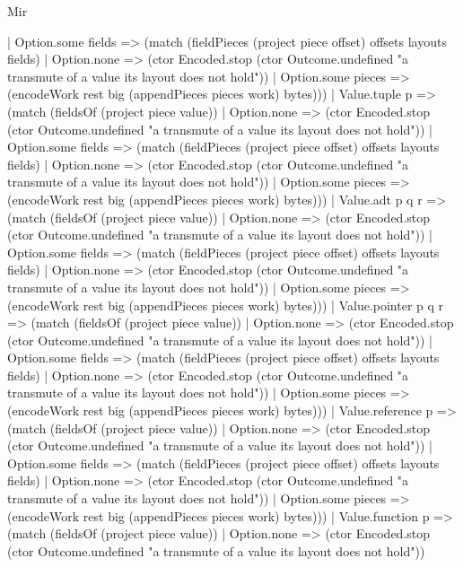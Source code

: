 \begin{lexlean}{Mir}
\begin{semanticmodule}
{            | Option.some fields => (match (fieldPieces (project piece offset) offsets layouts fields)
              | Option.none => (ctor Encoded.stop (ctor Outcome.undefined "a transmute of a value its layout does not hold"))
              | Option.some pieces => (encodeWork rest big (appendPieces pieces work) bytes)))
          | Value.tuple p => (match (fieldsOf (project piece value))
            | Option.none => (ctor Encoded.stop (ctor Outcome.undefined "a transmute of a value its layout does not hold"))
            | Option.some fields => (match (fieldPieces (project piece offset) offsets layouts fields)
              | Option.none => (ctor Encoded.stop (ctor Outcome.undefined "a transmute of a value its layout does not hold"))
              | Option.some pieces => (encodeWork rest big (appendPieces pieces work) bytes)))
          | Value.adt p q r => (match (fieldsOf (project piece value))
            | Option.none => (ctor Encoded.stop (ctor Outcome.undefined "a transmute of a value its layout does not hold"))
            | Option.some fields => (match (fieldPieces (project piece offset) offsets layouts fields)
              | Option.none => (ctor Encoded.stop (ctor Outcome.undefined "a transmute of a value its layout does not hold"))
              | Option.some pieces => (encodeWork rest big (appendPieces pieces work) bytes)))
          | Value.pointer p q r => (match (fieldsOf (project piece value))
            | Option.none => (ctor Encoded.stop (ctor Outcome.undefined "a transmute of a value its layout does not hold"))
            | Option.some fields => (match (fieldPieces (project piece offset) offsets layouts fields)
              | Option.none => (ctor Encoded.stop (ctor Outcome.undefined "a transmute of a value its layout does not hold"))
              | Option.some pieces => (encodeWork rest big (appendPieces pieces work) bytes)))
          | Value.reference p => (match (fieldsOf (project piece value))
            | Option.none => (ctor Encoded.stop (ctor Outcome.undefined "a transmute of a value its layout does not hold"))
            | Option.some fields => (match (fieldPieces (project piece offset) offsets layouts fields)
              | Option.none => (ctor Encoded.stop (ctor Outcome.undefined "a transmute of a value its layout does not hold"))
              | Option.some pieces => (encodeWork rest big (appendPieces pieces work) bytes)))
          | Value.function p => (match (fieldsOf (project piece value))
            | Option.none => (ctor Encoded.stop (ctor Outcome.undefined "a transmute of a value its layout does not hold"))
}
\end{semanticmodule}
\end{lexlean}
